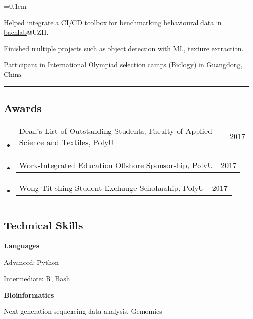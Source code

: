 \documentclass[10pt,letterpaper]{article}
\makeatletter
\newenvironment{indentsection}[1]%
{\begin{list}{}%
	{\setlength{\leftmargin}{#1}}%
	\item[]%
}
{\end{list}}
\newcommand{\headerrow}[2]
{\begin{tabular*}{\linewidth}{l@{\extracolsep{\fill}}r}
	#1 &
	#2 \\
\end{tabular*}}
\makeatother
\begin{document}

\begin{itemize*}
	\parskip=0.1em

	\item Helped integrate a CI/CD toolbox for benchmarking behavioural data in \href{http://bachlab.org/}{bachlab}@UZH.

	\item Finished multiple projects such as object detection with ML, texture extraction.

	\item Participant in International Olympiad selection camps (Biology) in Guangdong, China
	
\end{itemize*}



\hrule
\vspace{-1em}
\subsection*{Awards}

\begin{itemize}
	\parskip=0.1em
		\item
		\headerrow
			{Dean’s List of Outstanding Students, Faculty of Applied Science and Textiles, PolyU}
			{2017}

		\item
		\headerrow
			{Work-Integrated Education Offshore Sponsorship, PolyU}
            {2017}

        \item
		\headerrow
            {Wong Tit-shing Student Exchange Scholarship, PolyU}
            {2017}

\end{itemize}



\hrule
\vspace{-1em}
\subsection*{Technical Skills}

\begin{indentsection}{\parindent}
\begin{description*}
	\item
	{\textbf{Languages}}

	\begin{itemize*}
        \item {Advanced: Python}
        \item {Intermediate: R, Bash}
	\end{itemize*}

	\item
	{\textbf{Bioinformatics}}

	Next-generation sequencing data analysis, Gemomics

\end{description*}
\end{indentsection}
\end{document}

